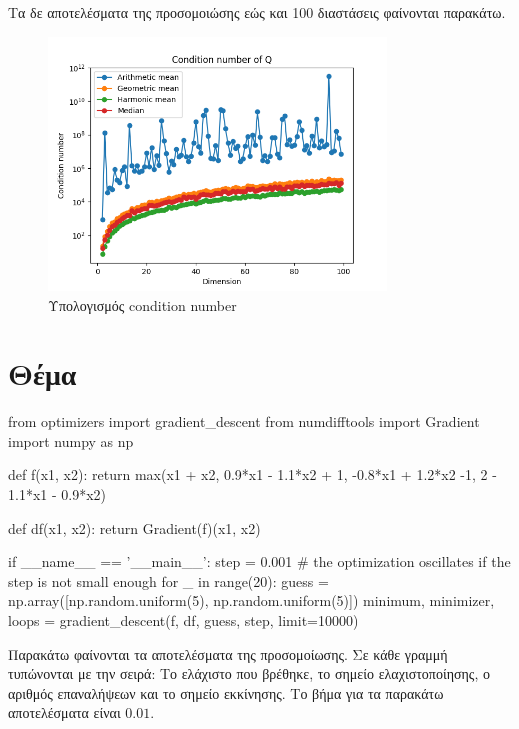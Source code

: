 \documentclass{article}
\newcommand{\eng}[1]{\foreignlanguage{english}{#1}} %
\begin{document}
Τα δε αποτελέσματα της προσομοιώσης εώς και 100 διαστάσεις φαίνονται παρακάτω.

\begin{figure}[h]
    \centering
    \includegraphics[width=0.8\textwidth]{part1/condition_number_vs_dims.png}
    \caption{Υπολογισμός \eng{condition number}}
\end{figure}

\clearpage
\section{Θέμα}

\begin{python}
from optimizers import gradient_descent
from numdifftools import Gradient
import numpy as np

def f(x1, x2):
    return max(x1 + x2,
               0.9*x1 - 1.1*x2 + 1,
               -0.8*x1 + 1.2*x2 -1,
               2 - 1.1*x1 - 0.9*x2)

def df(x1, x2):
    return Gradient(f)(x1, x2)

if __name__ == '__main__':
    step = 0.001 # the optimization oscillates if the step is not small enough
    for _ in range(20):
        guess = np.array([np.random.uniform(5), np.random.uniform(5)])
        minimum, minimizer, loops = gradient_descent(f, df, guess, step, limit=10000)
\end{python}

Παρακάτω φαίνονται τα αποτελέσματα της προσομοίωσης. Σε κάθε γραμμή τυπώνονται με την σειρά:
Το ελάχιστο που βρέθηκε, το σημείο ελαχιστοποίησης, ο αριθμός επαναλήψεων και το σημείο εκκίνησης.
Το βήμα για τα παρακάτω αποτελέσματα είναι $0.01$.
\end{document}
